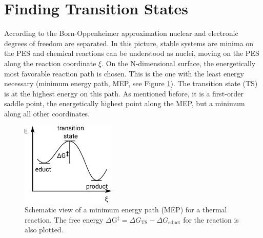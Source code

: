 \documentclass[11pt,DIV=13,BCOR=5mm,a4paper,headinclude]{scrbook}
\begin{document}
\section{Finding Transition States}\label{sec:tst}
According to the Born-Oppenheimer approximation\cite{bornoppenheimer} nuclear and electronic degrees of freedom are separated.
In this picture, stable systems are minima on the PES and chemical reactions can be understood as nuclei, moving on the PES along the reaction coordinate $\xi$.
On the N-dimensional surface, the energetically most favorable reaction path is chosen.
This is the one with the least energy necessary (minimum energy path, MEP, see Figure \ref{abb:mep}).
The transition state (TS) is at the highest energy on this path.
As mentioned before, it is a first-order saddle point, the energetically highest point along the MEP, but a minimum along all other coordinates.
\begin{figure}[!h]
\centering
 \includegraphics[width=0.4\textwidth]{figures/theory/MEP.pdf}
   \caption{Schematic view of a minimum energy path (MEP) for a thermal reaction.
The free energy $\Delta$G$^\ddagger= \Delta G_\textrm{TS}-\Delta G_\textrm{educt}$ for the reaction is also plotted.}
            \label{abb:mep}
\end{figure}
\\
\end{document}
